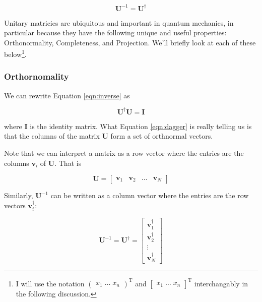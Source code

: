 \documentclass[11pt, oneside]{article}   	%
\begin{document}
\begin{equation}
\mathbf{U}^{-1} = \mathbf{U}^{\dagger}
\label{eqn:inverse}
\end{equation}

\bigskip
\noindent
Unitary matricies are ubiquitous and important in quantum mechanics, in 
particular because they have the following unique and useful properties: Orthonormality, Completeness, and Projection. We'll briefly look at each of these below\footnote{I will use the 
notation $\begin{pmatrix} x_1 \; \hdots \; x_n \end{pmatrix}^{\text{T}}$ and $\begin{bmatrix} x_1 \; \hdots \; x_n \end{bmatrix}^\text{T}$ interchangably in the following discussion.}.

\subsubsection{Orthornomality}
We can rewrite Equation \ref{eqn:inverse} as

\begin{equation}
\mathbf{U}^{\dagger} \mathbf{U} = \mathbf{I}
\label{eqn:dagger}
\end{equation}

\bigskip
\noindent
where \textbf{I} is the identity matrix. What Equation \ref{eqn:dagger} is really telling us is that the columns of the matrix \textbf{U} form a set of orthnormal vectors.

\bigskip
\noindent
Note that we can interpret a matrix as a row vector where the entries are the columns  $\mathbf{v}_i$ of \textbf{U}. That is

\begin{equation*}
\mathbf{U} = \begin{bmatrix} \mathbf{v}_1 & \mathbf{v}_2 & \hdots & \mathbf{v}_{N} \end{bmatrix}
\end{equation*}

\bigskip
\noindent
Similarly, $\mathbf{U}^{-1}$ can be written as a column vector where the entries are the row vectors $ \mathbf{v}_{i}^\dagger$:

\begin{equation*}
\mathbf{U}^{-1} = \mathbf{U}^{\dagger} = \begin{bmatrix} \mathbf{v}_1^\dagger \\ \mathbf{v}_2^\dagger \\ \vdots  \\ \mathbf{v}_{N}^\dagger  \end{bmatrix}
\end{equation*}
\end{document}
